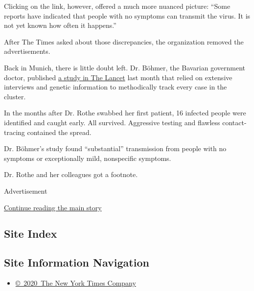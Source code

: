 Clicking on the link, however, offered a much more nuanced picture:
``Some reports have indicated that people with no symptoms can transmit
the virus. It is not yet known how often it happens.''

After The Times asked about those discrepancies, the organization
removed the advertisements.

Back in Munich, there is little doubt left. Dr. Böhmer, the Bavarian
government doctor, published
\href{https://www.thelancet.com/journals/laninf/article/PIIS1473-3099(20)30314-5/fulltex}{a
study in The Lancet} last month that relied on extensive interviews and
genetic information to methodically track every case in the cluster.

In the months after Dr. Rothe swabbed her first patient, 16 infected
people were identified and caught early. All survived. Aggressive
testing and flawless contact-tracing contained the spread.

Dr. Böhmer's study found ``substantial'' transmission from people with
no symptoms or exceptionally mild, nonspecific symptoms.

Dr. Rothe and her colleagues got a footnote.

Advertisement

\protect\hyperlink{after-bottom}{Continue reading the main story}

\hypertarget{site-index}{%
\subsection{Site Index}\label{site-index}}

\hypertarget{site-information-navigation}{%
\subsection{Site Information
Navigation}\label{site-information-navigation}}

\begin{itemize}
\tightlist
\item
  \href{https://help.nytimes.com/hc/en-us/articles/115014792127-Copyright-notice}{©~2020~The
  New York Times Company}
\end{itemize}

